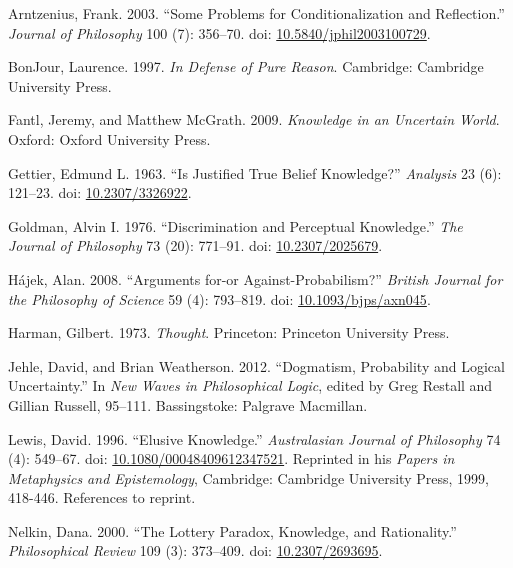 \documentclass[
  10pt,
  letterpaper,
  DIV=11,
  numbers=noendperiod,
  twoside]{scrartcl}
\newlength{\cslhangindent}
\newenvironment{CSLReferences}[2] %
 {\begin{list}{}{%
  \setlength{\itemindent}{0pt}
  \setlength{\leftmargin}{0pt}
  \setlength{\parsep}{0pt}
  \ifodd #1
   \setlength{\leftmargin}{\cslhangindent}
   \setlength{\itemindent}{-1\cslhangindent}
  \fi
  \setlength{\itemsep}{#2\baselineskip}}}
 {\end{list}}
\begin{document}
\label{refs}
\begin{CSLReferences}{1}{0}
Arntzenius, Frank. 2003. {``Some Problems for Conditionalization and
Reflection.''} \emph{Journal of Philosophy} 100 (7): 356--70. doi:
\href{https://doi.org/10.5840/jphil2003100729}{10.5840/jphil2003100729}.

BonJour, Laurence. 1997. \emph{In Defense of Pure Reason}. Cambridge:
Cambridge University Press.

Fantl, Jeremy, and Matthew McGrath. 2009. \emph{Knowledge in an
Uncertain World}. Oxford: Oxford University Press.

Gettier, Edmund L. 1963. {``Is Justified True Belief Knowledge?''}
\emph{Analysis} 23 (6): 121--23. doi:
\href{https://doi.org/10.2307/3326922}{10.2307/3326922}.

Goldman, Alvin I. 1976. {``Discrimination and Perceptual Knowledge.''}
\emph{The Journal of Philosophy} 73 (20): 771--91. doi:
\href{https://doi.org/10.2307/2025679}{10.2307/2025679}.

Hájek, Alan. 2008. {``Arguments for-or Against-Probabilism?''}
\emph{British Journal for the Philosophy of Science} 59 (4): 793--819.
doi: \href{https://doi.org/10.1093/bjps/axn045}{10.1093/bjps/axn045}.

Harman, Gilbert. 1973. \emph{Thought}. Princeton: Princeton University
Press.

Jehle, David, and Brian Weatherson. 2012. {``Dogmatism, Probability and
Logical Uncertainty.''} In \emph{New Waves in Philosophical Logic},
edited by Greg Restall and Gillian Russell, 95--111. Bassingstoke:
Palgrave Macmillan.

Lewis, David. 1996. {``Elusive Knowledge.''} \emph{Australasian Journal
of Philosophy} 74 (4): 549--67. doi:
\href{https://doi.org/10.1080/00048409612347521}{10.1080/00048409612347521}.
Reprinted in his \emph{Papers in Metaphysics and Epistemology},
Cambridge: Cambridge University Press, 1999, 418-446. References to
reprint.

Nelkin, Dana. 2000. {``The Lottery Paradox, Knowledge, and
Rationality.''} \emph{Philosophical Review} 109 (3): 373--409. doi:
\href{https://doi.org/10.2307/2693695}{10.2307/2693695}.


\end{CSLReferences}
\end{document}
